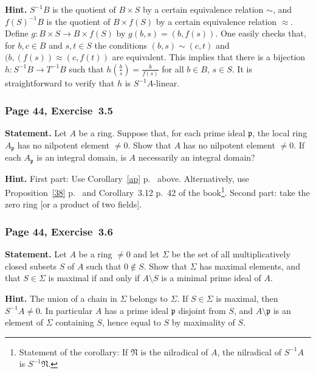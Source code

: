 \documentclass[12pt,letterpaper]{article}%
\newcommand{\mf}{\mathfrak}
\newcommand{\ppp}{\mf p}
\newcommand{\NNN}{\mf N}\newcommand{\RRR}{\mf R}
\newcommand{\nn}{\noindent}
\begin{document}
\nn\textbf{Hint.} $S^{-1}B$ is the quotient of $B\times S$ by a certain equivalence relation $\sim$, and $f(S)^{-1}B$ is the quotient of $B\times f(S)$ by a certain equivalence relation $\approx$. Define $g:B\times S\to B\times f(S)$ by $g(b,s)=(b,f(s))$. One easily checks that, for $b,c\in B$ and $s,t\in S$ the conditions $(b,s)\sim(c,t)$ and $(b,(f(s))\approx(c,f(t))$ are equivalent. This implies that there is a bijection $h:S^{-1}B\to T^{-1}B$ such that $h(\frac bs)=\frac b{f(s)}$ for all $b\in B$, $s\in S$. It is straightforward to verify that $h$ is $S^{-1}A$-linear.

\subsubsection{Page 44, Exercise~3.5}%

\textbf{Statement.} Let $A$ be a ring. Suppose that, for each prime ideal $\ppp$, the local ring $A_\ppp$ has no nilpotent element $\ne0$. Show that $A$ has no nilpotent element $\ne0$. If each $A_\ppp$ is an integral domain, is $A$ necessarily an integral domain?

\nn\textbf{Hint.} First part: Use Corollary~\ref{ap} p.~\pageref{ap} above. Alternatively, use Proposition~\ref{38} p.~\pageref{38} and Corollary~3.12 p.~42 of the book\footnote{Statement of the corollary: If $\NNN$ is the nilradical of $A$, the nilradical of $S^{-1}A$ is $S^{-1}\NNN$.}. Second part: take the zero ring [or a product of two fields].

\subsubsection{Page 44, Exercise~3.6}\label{ex3.6}%

\textbf{Statement.} Let $A$ be a ring $\ne0$ and let $\Sigma$ be the set of all multiplicatively closed subsets $S$ of $A$ such that $0\notin S$. Show that $\Sigma$ has maximal elements, and that $S\in\Sigma$ is maximal if and only if $A\setminus S$ is a minimal prime ideal of $A$.

\nn\textbf{Hint.} The union of a chain in $\Sigma$ belongs to $\Sigma$. If $S\in\Sigma$ is maximal, then $S^{-1}A\ne0$. In particular $A$ has a prime ideal $\ppp$ disjoint from $S$, and $A\setminus\ppp$ is an element of $\Sigma$ containing $S$, hence equal to $S$ by maximality of $S$.

\end{document}
